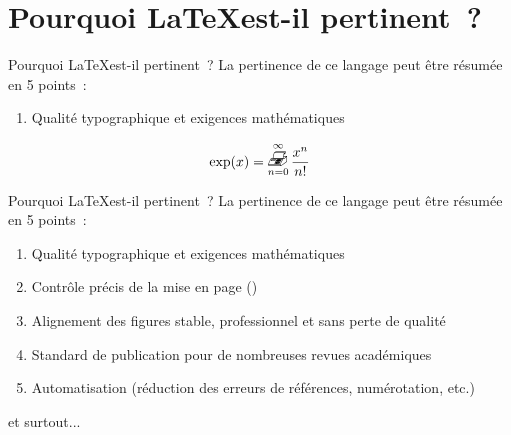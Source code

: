 
\section{Pourquoi \LaTeX\;est-il pertinent~?}

\begin{frame}{Pourquoi \LaTeX\;est-il pertinent~?}
    La pertinence de ce langage peut être résumée en 5 points~:
    \vspace{0.5cm}
    \pause
    \begin{enumerate}
        \item Qualité typographique et exigences mathématiques
        \pause
    \end{enumerate}
    \begin{align}
        \exp(x) = \faxoperator_{n=0}^\infty\frac{x^n}{n!}
        \label{eq: faxop_exp}
    \end{align}
\end{frame}

\begin{frame}{Pourquoi \LaTeX\;est-il pertinent~?}
    La pertinence de ce langage peut être résumée en 5 points~:
    \vspace{0.5cm}
    \begin{enumerate}
        \item Qualité typographique et exigences mathématiques
        \item Contrôle précis de la mise en page ()
        \pause
        \item Alignement des figures stable, professionnel et sans
        perte de qualité
        \pause
        \item Standard de publication pour de nombreuses revues académiques
        \pause
        \item Automatisation (réduction des erreurs de références, numérotation, etc.)
    \end{enumerate}
    \vspace{0.5cm}
    \pause
    et surtout...
\end{frame}

